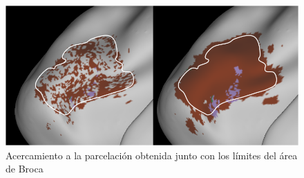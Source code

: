 \begin{figure}[h!]
   \centering
    \includegraphics[width=\textwidth]{img/inf_vs_rec.png}
    \caption{Acercamiento a la parcelaci\'on obtenida junto con los l\'imites
            del \'area de Broca}
    \label{fig:infvsrec}
\end{figure}
